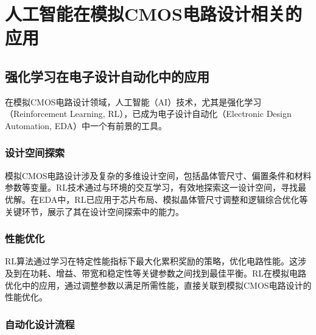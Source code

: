 %
%
%
%
%

\chapter{人工智能在模拟CMOS电路设计相关的应用}

\section{强化学习在电子设计自动化中的应用}

在模拟CMOS电路设计领域，人工智能（AI）技术，尤其是强化学习（Reinforcement Learning, RL），已成为电子设计自动化（Electronic Design Automation, EDA）中一个有前景的工具。

\subsection{设计空间探索}

模拟CMOS电路设计涉及复杂的多维设计空间，包括晶体管尺寸、偏置条件和材料参数等变量。RL技术通过与环境的交互学习，有效地探索这一设计空间，寻找最优解。在EDA中，RL已应用于芯片布局、模拟晶体管尺寸调整和逻辑综合优化等关键环节，展示了其在设计空间探索中的能力。

\subsection{性能优化}

RL算法通过学习在特定性能指标下最大化累积奖励的策略，优化电路性能。这涉及到在功耗、增益、带宽和稳定性等关键参数之间找到最佳平衡。RL在模拟电路优化中的应用，通过调整参数以满足所需性能，直接关联到模拟CMOS电路设计的性能优化。\cite{10617712}

\subsection{自动化设计流程}

